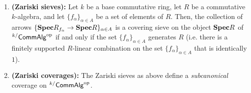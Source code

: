                     \begin{theorem} \label{theorem: zariski_coverages}
                        \noindent
                        \begin{enumerate}
                            \item \textbf{(Zariski sieves):} Let $k$ be a base commutative ring, let $R$ be a commutative $k$-algebra, and let $\{f_{\alpha}\}_{\alpha \in A}$ be a set of elements of $R$. Then, the collection of arrows $\{\mathbf{Spec} R_{f_{\alpha}} \to \mathbf{Spec} R\}_{\alpha \in A}$ is a covering sieve on the object $\mathbf{Spec} R$ of ${}^{k/}\mathsf{Comm}\mathsf{Alg}^{\mathrm{op}}$ if and only if the set $\{f_{\alpha}\}_{\alpha \in A}$ generates $R$ (i.e. there is a finitely supported $R$-linear combination on the set $\{f_{\alpha}\}_{\alpha \in A}$ that is identically $1$). 
                            \item \textbf{(Zariski coverages):} The Zariski sieves as above define a \textit{subcanonical} coverage on ${}^{k/}\mathsf{Comm}\mathsf{Alg}^{\mathrm{op}}$.
                        \end{enumerate}
                    \end{theorem}
